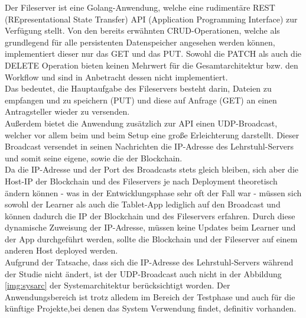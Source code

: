 Der Fileserver ist eine Golang-Anwendung, welche eine rudimentäre REST (REpresentational State Transfer) API (Application Programming Interface) zur Verfügung stellt.
Von den bereits erwähnten CRUD-Operationen, welche als grundlegend für alle persistenten Datenspeicher angesehen werden können, implementiert dieser nur das GET und das PUT. Sowohl die PATCH als auch die DELETE Operation bieten keinen Mehrwert für die Gesamtarchitektur bzw. den Workflow und sind in Anbetracht dessen nicht implementiert.\\
Das bedeutet, die Hauptaufgabe des Fileservers besteht darin, Dateien zu empfangen und zu speichern (PUT) und diese auf Anfrage (GET) an einen Antragsteller wieder zu versenden.\\
Außerdem bietet die Anwendung zusätzlich zur API einen UDP-Broadcast, welcher vor allem beim  und beim Setup eine große Erleichterung darstellt. Dieser Broadcast versendet in seinen Nachrichten die IP-Adresse des Lehrstuhl-Servers und somit seine eigene, sowie die der Blockchain.\\
Da die IP-Adresse und der Port des Broadcasts stets gleich bleiben, sich aber die Host-IP der Blockchain und des Fileservers je nach Deployment theoretisch ändern können - was in der Entwicklungsphase sehr oft der Fall war - müssen sich sowohl der Learner als auch die Tablet-App lediglich auf den Broadcast  und können dadurch die IP der Blockchain und des Fileservers erfahren. Durch diese dynamische Zuweisung der IP-Adresse, müssen keine Updates beim Learner und der App durchgeführt werden, sollte die Blockchain und der Fileserver auf einem anderen Host deployed werden. \\
Aufgrund der Tatsache, dass sich die IP-Adresse des Lehrstuhl-Servers während der Studie nicht ändert, ist der UDP-Broadcast auch nicht in der Abbildung \ref{img:sysarc} der Systemarchitektur berücksichtigt worden. Der Anwendungsbereich ist trotz alledem im Bereich der Testphase und auch für die künftige Projekte,bei denen das System Verwendung findet, definitiv vorhanden.

